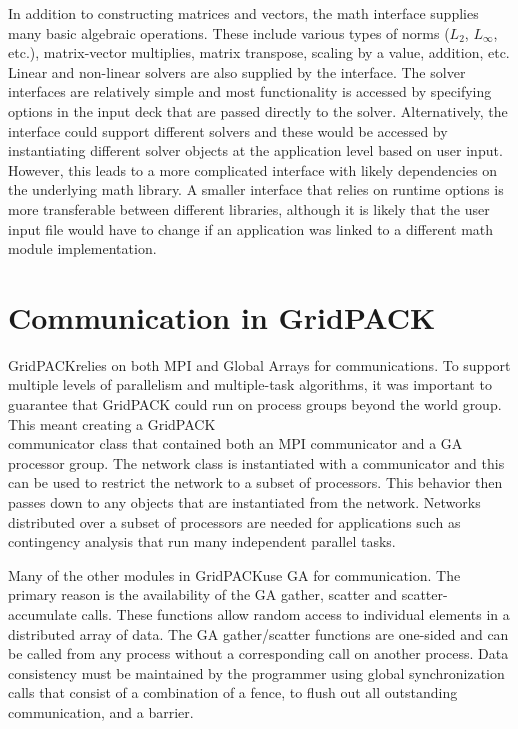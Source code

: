 \documentclass[preprint]{acm_proc_article-sp}
\begin{document}
In addition to constructing matrices and vectors, the math interface supplies
many basic algebraic operations. These include various types of norms ($L_2$,
$L_{\infty}$, etc.), matrix-vector multiplies, matrix transpose, scaling by a
value, addition, etc. Linear and non-linear solvers are also supplied by the
interface. The solver interfaces are relatively simple and most functionality
is accessed by
specifying options in the input deck that are passed directly to the solver.
Alternatively, the interface could support different solvers and these would be
accessed by instantiating different solver objects at the application level
based on user input. However, this leads to a more complicated interface with
likely dependencies on the underlying math library. A smaller interface that
relies on runtime options is more transferable between different libraries,
although it is likely that the user input file would have to change if an
application was linked to a different math module implementation.

\section{Communication in GridPACK\texttrademark}
GridPACK\texttrademark relies on both MPI\cite{MPI1} and Global Arrays\cite{GA}
for communications.
To support multiple levels of parallelism and multiple-task algorithms, it was
important to guarantee that GridPACK could run on process groups beyond the
world group. This meant creating a GridPACK\texttrademark\\
communicator class
that contained both an MPI communicator and a GA processor group. The network
class is instantiated with a communicator and this can be used to restrict the
network to a subset of processors. This behavior then passes down to any
objects that are instantiated from the network. Networks distributed over a
subset of processors are needed for applications such as contingency
analysis\cite{CA}
that run many independent parallel tasks.

Many of the other modules in GridPACK\texttrademark use GA for communication.
The primary reason is the availability of the GA gather, scatter and
scatter-accumulate calls. These functions allow random access to individual
elements in a distributed array of data. The GA gather/scatter functions are
one-sided and can be called from any process without a
corresponding call on another process. Data consistency must be maintained by
the programmer using global synchronization calls that consist of a combination
of a fence, to flush out all outstanding communication, and a barrier.
\end{document}
